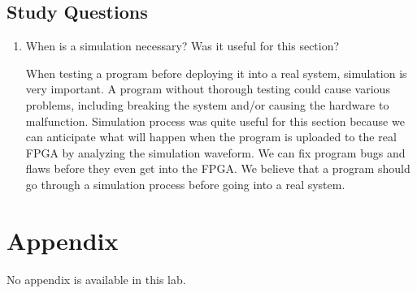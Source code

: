 \documentclass[12pt]{article}
\begin{document}
\subsection*{Study Questions}

\begin{enumerate}
  \item When is a simulation necessary? Was it useful for this section?

  When testing a program before deploying it into a real system, simulation is very important. A program without thorough testing could cause various problems, including breaking the system and/or causing the hardware to malfunction. Simulation process was quite useful for this section because we can anticipate what will happen when the program is uploaded to the real FPGA by analyzing the simulation waveform. We can fix program bugs and flaws before they even get into the FPGA. We believe that a program should go through a simulation process before going into a real system.
\end{enumerate}

\section*{Appendix}

No appendix is available in this lab.



\end{document}
